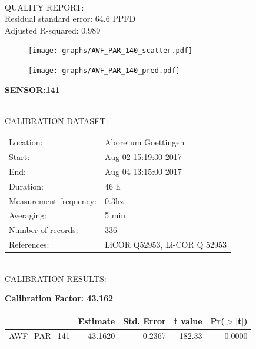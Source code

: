 \documentclass[oneside]{report}
\begin{document}
\hrulefill\\
QUALITY REPORT:\\
Residual standard error: 64.6 PPFD\\
Adjusted R-squared: 0.989



\begin{figure}[H]
  \centering
  \texttt{[image: graphs/AWF\_PAR\_140\_scatter.pdf]}
\end{figure}




\begin{figure}[H]
  \centering
  \texttt{[image: graphs/AWF\_PAR\_140\_pred.pdf]}
\end{figure}

\pagebreak


\begin{center}
\large{\textbf{SENSOR:141}}\\
\end{center}

\hrulefill\\
CALIBRATION DATASET:\\
\begin{table}[h!]
  \centering
  \label{tab:table1}
  \begin{tabular}{ll}
    Location: & Aboretum Goettingen\\ 
    
    
    Start:  & Aug 02 15:19:30 2017 \\
    End:   & Aug 04 13:15:00 2017\\ 
    Duration: & 46 h\\
    Measurement frequency: & 0.3hz\\
    Averaging:  &5 min\\
    Number of records: & 336 \\
    References: & LiCOR Q52953, Li-COR Q 52953 \\
  \end{tabular}
\end{table}

\hrulefill\\
CALIBRATION RESULTS:\\


\begin{center}
\textbf{\large{Calibration Factor: 43.162}}\\
\end{center}
\begin{table}[ht]
\centering
\begin{tabular}{rrrrr}
  \hline
 & Estimate & Std. Error & t value & Pr($>$$|$t$|$) \\ 
  \hline
AWF\_PAR\_141 & 43.1620 & 0.2367 & 182.33 & 0.0000 \\ 
   \hline
\end{tabular}
\end{table}
\end{document}
